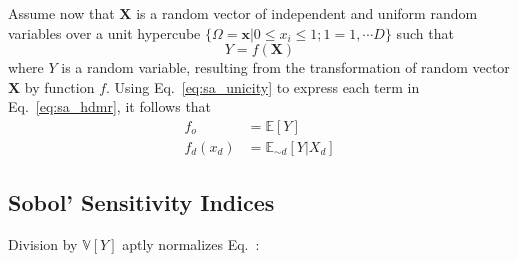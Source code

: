 Assume now that $\mathbf{X}$ is a random vector of independent and uniform random variables over a unit hypercube
$\{\Omega = \mathbf{x} | 0 \leq x_i  \leq 1; 1 = 1,\cdots D\}$ such that
\begin{equation}
	Y = f(\mathbf{X})
\label{eq:sa_random_function}
\end{equation}
where $Y$ is a random variable, resulting from the transformation of random vector $\mathbf{X}$ by function $f$.
Using Eq.~\ref{eq:sa_unicity} to express each term in Eq.~\ref{eq:sa_hdmr}, it follows that
\begin{equation}
	\begin{split}
		f_o & = \mathbb{E}[Y] \\
	  f_d(x_d) & = \mathbb{E}_{\sim d}[Y|X_d] 
	\end{split}
\label{eq:sa_conditional_expectation}
\end{equation}

\subsection{Sobol' Sensitivity Indices}\label{sub:sa_sobol_indices}

Division by $\mathbb{V}[Y]$ aptly normalizes Eq.~:

